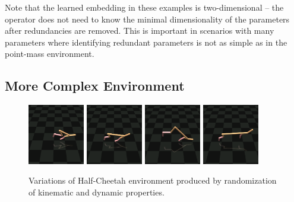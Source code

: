 \documentclass{article}
\begin{document}
Note that the learned embedding in these examples is two-dimensional -- 
the operator does not need to know the minimal dimensionality of the parameters after redundancies are removed.
This is important in scenarios with many parameters where identifying redundant parameters 
is not as simple as in the point-mass environment.

\subsection{More Complex Environment}

\begin{figure}[h]
\includegraphics[trim=4cm 3cm 0cm 4cm, clip, width=0.22\textwidth]{cheetah_short.png}\hfill
\includegraphics[trim=4cm 3cm 0cm 4cm, clip, width=0.22\textwidth]{cheetah_medium.png}\hfill
\includegraphics[trim=4cm 3cm 0cm 4cm, clip, width=0.22\textwidth]{cheetah_backleg.png}\hfill
\includegraphics[trim=4cm 3cm 0cm 4cm, clip, width=0.22\textwidth]{cheetah_long.png}
\caption{Variations of Half-Cheetah environment produced by randomization of kinematic and dynamic properties.}
\label{cheetahs}
\end{figure}
\end{document}
